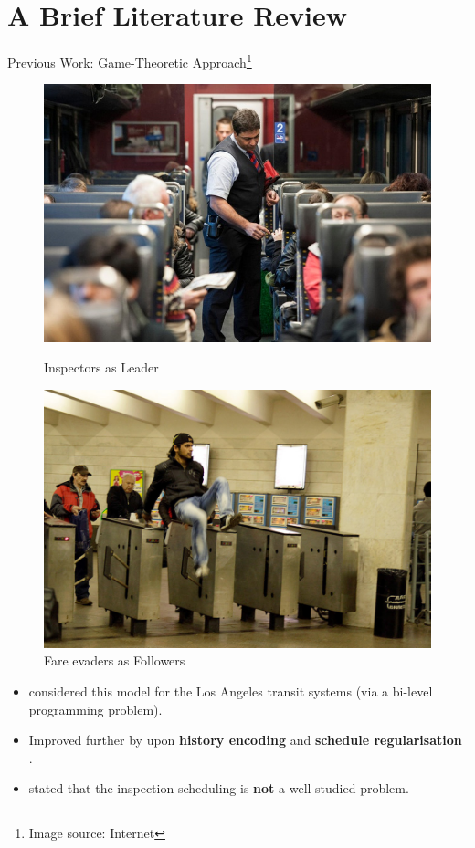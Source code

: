 \documentclass[handout]{beamer}
\begin{document}
\section{A Brief Literature Review}
\begin{frame}{Previous Work: Game-Theoretic Approach\footnote{Image source: Internet}}

 \begin{figure}[ht]
        \begin{minipage}[b]{0.45\linewidth}
            \centering
            \includegraphics[width=.6\textwidth]{inspector.jpg}
            \caption*{Inspectors as Leader}
        \end{minipage}
        \hspace{0.5cm}
        \begin{minipage}[b]{0.45\linewidth}
            \centering
            \includegraphics[width=.6\textwidth]{fare_evader.jpg}
            \caption*{Fare evaders as Followers}
        \end{minipage}
    \end{figure}
    
\begin{itemize}
    \item \cite{yin_jiang_tambe_kiekintveld_leyton-brown_sandholm_sullivan_2012} considered this model for the 
    Los Angeles transit systems (via a bi-level programming problem).
    \item Improved further by \cite{jiang_yin_johnson_tambe_kiekintveld_leyton-brown_sandholm_2012} 
    upon \textbf{history encoding} and \textbf{schedule regularisation} .
    \item \cite{mastersthesis} stated that the inspection scheduling is \textbf{not} a well studied problem.
\end{itemize}
\end{frame}
\end{document}
